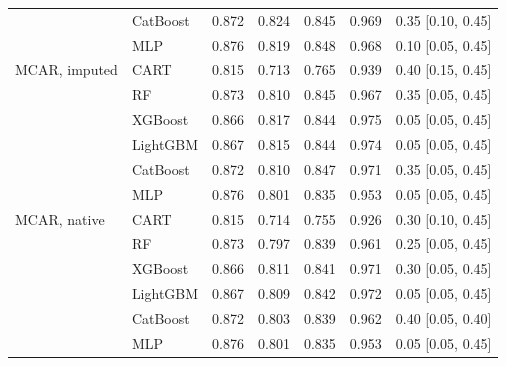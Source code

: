\documentclass[pdflatex,sn-mathphys]{sn-jnl}
\theoremstyle{thmstyleone}
\begin{document}
\begin{table}[htbp]
\begin{tabular}{@{}llrrrrl@{}}
 & CatBoost & 0.872 & 0.824 & 0.845 & 0.969 & 0.35 [0.10, 0.45] \\
 & MLP & 0.876 & 0.819 & 0.848 & 0.968 & 0.10 [0.05, 0.45] \\
\midrule
MCAR, imputed & CART & 0.815 & 0.713 & 0.765 & 0.939 & 0.40 [0.15, 0.45] \\
 & RF & 0.873 & 0.810 & 0.845 & 0.967 & 0.35 [0.05, 0.45] \\
 & XGBoost & 0.866 & 0.817 & 0.844 & 0.975 & 0.05 [0.05, 0.45] \\
 & LightGBM & 0.867 & 0.815 & 0.844 & 0.974 & 0.05 [0.05, 0.45] \\
 & CatBoost & 0.872 & 0.810 & 0.847 & 0.971 & 0.35 [0.05, 0.45] \\
 & MLP & 0.876 & 0.801 & 0.835 & 0.953 & 0.05 [0.05, 0.45] \\
\midrule
MCAR, native & CART & 0.815 & 0.714 & 0.755 & 0.926 & 0.30 [0.10, 0.45] \\
 & RF & 0.873 & 0.797 & 0.839 & 0.961 & 0.25 [0.05, 0.45] \\
 & XGBoost & 0.866 & 0.811 & 0.841 & 0.971 & 0.30 [0.05, 0.45] \\
 & LightGBM & 0.867 & 0.809 & 0.842 & 0.972 & 0.05 [0.05, 0.45] \\
 & CatBoost & 0.872 & 0.803 & 0.839 & 0.962 & 0.40 [0.05, 0.40] \\
 & MLP & 0.876 & 0.801 & 0.835 & 0.953 & 0.05 [0.05, 0.45] \\
\bottomrule
\end{tabular}
\end{table}
\end{document}
